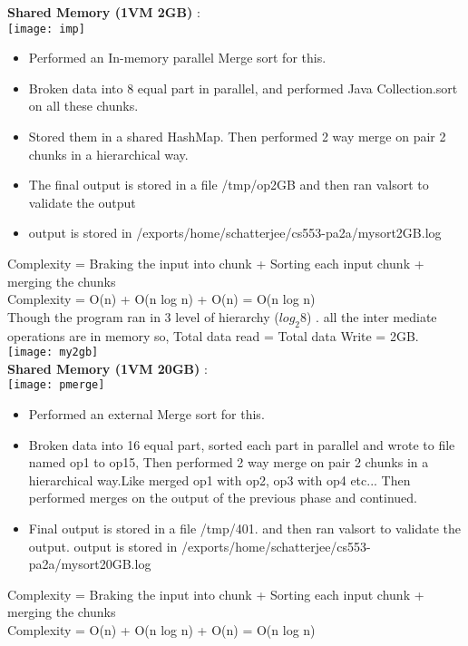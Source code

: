 \documentclass[3pt]{article}
\begin{document}
\textbf{Shared Memory (1VM 2GB)} : \\

\texttt{[image: imp]}

\begin{itemize}
\item Performed an In-memory parallel Merge sort for this.
\item Broken data into 8 equal part in parallel, and performed Java Collection.sort on all these chunks.
\item  Stored them in a shared HashMap. Then performed 2 way merge on pair 2 chunks in a hierarchical way. 
\item  The final output is stored in a file /tmp/op2GB and then ran valsort to validate the output
\item  output is stored in  /exports/home/schatterjee/cs553-pa2a/mysort2GB.log
\end{itemize}

Complexity = Braking the input into chunk + Sorting each input chunk + merging the chunks   \\
Complexity = O(n) + O(n log n) + O(n) = O(n log n) \\

Though the program ran in 3 level of hierarchy  ($log_2 8$) . all the inter mediate operations are in memory so,  Total data read = Total data Write = 2GB. \\

\texttt{[image: my2gb]} \\

\textbf{Shared Memory (1VM 20GB)} : \\

\texttt{[image: pmerge]}

\begin{itemize}
\item Performed an external Merge sort for this.
\item Broken data into 16 equal part, sorted each part in parallel and wrote to file named op1 to op15, Then performed 2 way merge on pair 2 chunks in a hierarchical way.Like merged op1 with op2, op3 with op4  etc... Then performed merges on the output of the previous phase and continued.
\item Final output is stored in a file  /tmp/401. and  then ran valsort to validate the output. output is stored in  /exports/home/schatterjee/cs553-pa2a/mysort20GB.log \
\end{itemize}

Complexity = Braking the input into chunk + Sorting each input chunk + merging the chunks   \\
Complexity = O(n) + O(n log n) + O(n) = O(n log n)
\end{document}
